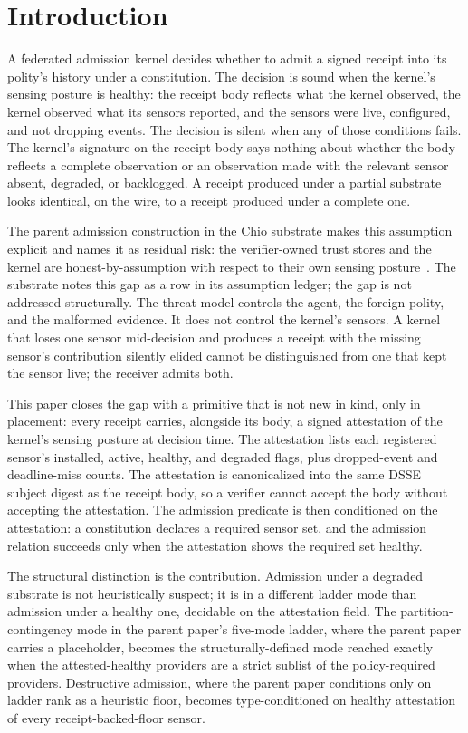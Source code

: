\section{Introduction}
\label{sec:intro}

A federated admission kernel decides whether to admit a signed receipt into its polity's history under a constitution. The decision is sound when the kernel's sensing posture is healthy: the receipt body reflects what the kernel observed, the kernel observed what its sensors reported, and the sensors were live, configured, and not dropping events. The decision is silent when any of those conditions fails. The kernel's signature on the receipt body says nothing about whether the body reflects a complete observation or an observation made with the relevant sensor absent, degraded, or backlogged. A receipt produced under a partial substrate looks identical, on the wire, to a receipt produced under a complete one.

The parent admission construction in the Chio substrate makes this assumption explicit and names it as residual risk: the verifier-owned trust stores and the kernel are honest-by-assumption with respect to their own sensing posture~. The substrate notes this gap as a row in its assumption ledger; the gap is not addressed structurally. The threat model controls the agent, the foreign polity, and the malformed evidence. It does not control the kernel's sensors. A kernel that loses one sensor mid-decision and produces a receipt with the missing sensor's contribution silently elided cannot be distinguished from one that kept the sensor live; the receiver admits both.

This paper closes the gap with a primitive that is not new in kind, only in placement: every receipt carries, alongside its body, a signed attestation of the kernel's sensing posture at decision time. The attestation lists each registered sensor's installed, active, healthy, and degraded flags, plus dropped-event and deadline-miss counts. The attestation is canonicalized into the same DSSE subject digest as the receipt body, so a verifier cannot accept the body without accepting the attestation. The admission predicate is then conditioned on the attestation: a constitution declares a required sensor set, and the admission relation succeeds only when the attestation shows the required set healthy.

The structural distinction is the contribution. Admission under a degraded substrate is not heuristically suspect; it is in a different ladder mode than admission under a healthy one, decidable on the attestation field. The partition-contingency mode in the parent paper's five-mode ladder, where the parent paper carries a placeholder, becomes the structurally-defined mode reached exactly when the attested-healthy providers are a strict sublist of the policy-required providers. Destructive admission, where the parent paper conditions only on ladder rank as a heuristic floor, becomes type-conditioned on healthy attestation of every receipt-backed-floor sensor.

